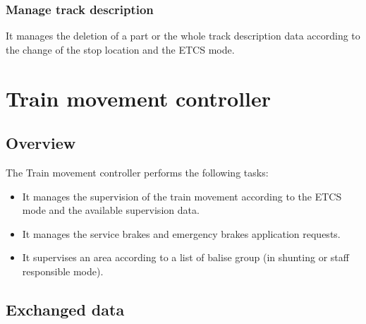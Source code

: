 \documentclass[nocc]{template/openetcs_report}
\begin{document}
\subsection{Manage track description}
It manages the deletion of a part or the whole track description data according to the change of the stop location and the ETCS mode.

\chapter{Train movement controller}
\section{Overview}
The Train movement controller performs the following tasks:
\begin{itemize}
\item	It manages the supervision of the train movement according to the ETCS mode and the available supervision data.
\item	It manages the service brakes and emergency brakes application requests.
\item	It supervises an area according to a list of balise group (in shunting or staff responsible mode).
\end{itemize}
\section{Exchanged data}
\end{document}
